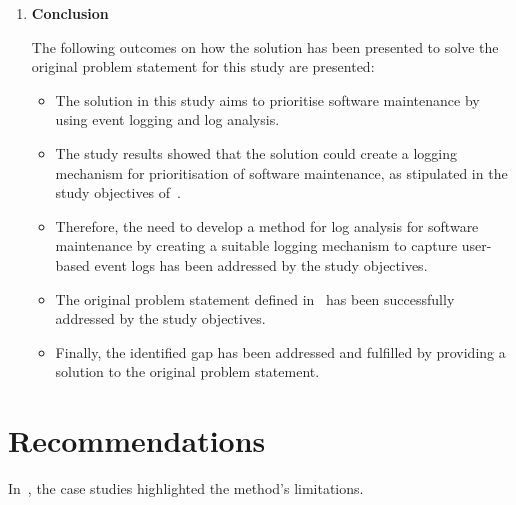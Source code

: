 \begin{enumerate}[label=\textbf{\Roman*.}]
\begin{itemize}
		\item Creating software maintenance prioritising (\ref{fr:maintenancePrioritising}) from the results of log analysis. In the log analysis, the different subsystems' maintenance priority ($M_{PF}$) are calculated from the normalised total active users ($P_N$) multiplied by the normalised total user activity ($A_N$) for a specified subsystem in~. \par These results are verified with the test case study and Case Studies A, B, and C in~ on different software systems with different operational use cases. The results obtained for the maintenance priority validate the previous implementation using the defined user-based logs to perform the log analysis for the maintenance priority. 
	\end{itemize}

	\clearpage

\item \textbf{Conclusion} \par The following outcomes on how the solution has been presented to solve the original problem statement for this study are presented:
	\begin{itemize}
		\item The solution in this study aims to prioritise software maintenance by using event logging and log analysis.
		\item The study results showed that the solution could create a logging mechanism for prioritisation of software maintenance, as stipulated in the study objectives of~.
		\item Therefore, the need to develop a method for log analysis for software maintenance by creating a suitable logging mechanism to capture user-based event logs has been addressed by the study objectives.
		\item The original problem statement defined in~ has been successfully addressed by the study objectives.
		\item Finally, the identified gap has been addressed and fulfilled by providing a solution to the original problem statement.
	\end{itemize}
\end{enumerate}

\section{Recommendations}
In~, the case studies highlighted the method's limitations.


